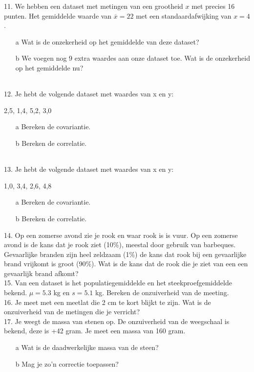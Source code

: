 11. We hebben een dataset met metingen van een grootheid $x$ met precies 16 punten. Het gemiddelde waarde van $\overline{x} = 22$ met een standaardafwijking van $x = 4 $.
\begin{itemize}
\item[a] Wat is de onzekerheid op het gemiddelde van deze dataset?
\item[b] We voegen nog 9 extra waardes aan onze dataset toe. Wat is de onzekerheid op het gemiddelde nu?
\end{itemize}
\\

12. Je hebt de volgende dataset met waardes van x en y:\\
\begin{center} {2,5}, {1,4}, {5,2}, {3,0}\end{center}
\begin{itemize}
\item[a] Bereken de covariantie.
\item[b] Bereken de correlatie.
\end{itemize}
\\

13. Je hebt de volgende dataset met waardes van x en y:\\
\begin{center}{1,0}, {3,4}, {2,6}, {4,8}\end{center}
\begin{itemize}
 \item[a] Bereken de covariantie.
 \item[b] Bereken de correlatie.
\end{itemize}
   

14. Op een zomerse avond zie je rook en waar rook is is vuur. Op een zomerse avond is de kans dat je rook ziet (10\%), meestal door gebruik van barbeques. Gevaarlijke branden zijn heel zeldzaam (1\%) de kans dat rook bij een gevaarlijke brand vrijkomt is groot (90\%). Wat is de kans dat de rook die je ziet van een een gevaarlijk brand afkomt?\\


15. Van een dataset is het populatiegemiddelde en het steekproefgemiddelde bekend. $\mu = 5.3 $ kg en $s = 5.1$ kg. Bereken de onzuiverheid van de meeting.\\
 

16. Je meet met een meetlat die 2 cm te kort blijkt te zijn. Wat is de onzuiverheid van de metingen die je verricht?\\


17. Je weegt de massa van stenen op. De onzuiverheid van de weegschaal is bekend, deze is +42 gram. Je meet een massa van 160 gram.
\begin{itemize}
\item[a]  Wat is de daadwerkelijke massa van de steen?
\item[b] Mag je zo'n correctie toepassen?
\end{itemize}


